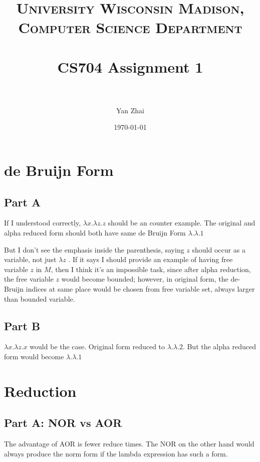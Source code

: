 \documentclass[paper=a4, fontsize=11pt]{scrartcl} %
\title{	
\normalfont \normalsize 
\textsc{University Wisconsin Madison, Computer Science Department} \\ [25pt] %
\horrule{0.5pt} \\[0.4cm] %
\huge CS704 Assignment 1\\ %
\horrule{2pt} \\[0.5cm] %
}
\author{Yan Zhai} %
\date{\normalsize\today} %
\numberwithin{equation}{section} %
\numberwithin{figure}{section} %
\numberwithin{table}{section} %
\begin{document}
\maketitle %

\section{de Bruijn Form}

\subsection{Part A}
If I understood correctly, $\lambda x. \lambda z. z$ should be an counter example. The original and alpha reduced form should both have same de Bruijn Form $\lambda . \lambda . 1$

But I don't see the emphasis inside the parenthesis, saying $z$ should occur as a variable, not just $\lambda z$ . If it says I should provide an example of having free variable $z$ in $M$, then I think it's an impossible task, since after alpha reduction, the free variable $z$ would become bounded; however, in original form, the de-Bruijn indices at same place would be chosen from free variable set, always larger than bounded variable.

\subsection{Part B}
$\lambda x. \lambda z. x$ would be the case. Original form reduced to $ \lambda . \lambda . 2 $.
But the alpha reduced form would become $\lambda . \lambda . 1$


\section{Reduction}

\subsection{Part A: NOR vs AOR}
The advantage of AOR is fewer reduce times. The NOR on the other hand would always produce the norm form if the lambda expression has such a form.
\end{document}
